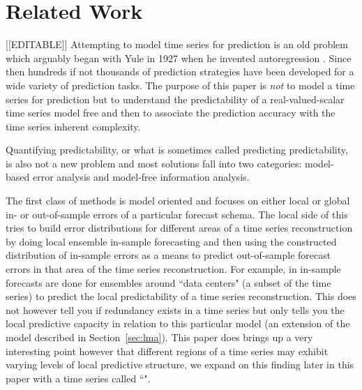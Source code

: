 \section{Related Work }\label{sec:related}
{\color{blue}[[EDITABLE]]}
Attempting to model time series for prediction is an old problem which arguably began with Yule in 1927 when he invented autoregression \cite{Yule27}. Since then hundreds if not thousands of prediction strategies have been developed for a wide variety of prediction tasks. The purpose of this paper is \emph{not} to model a time series for prediction but to understand the predictability of a real-valued-scalar time series model free and then to associate the prediction accuracy with the time series inherent complexity. 

Quantifying predictability, or what is sometimes called predicting predictability, is also not a new problem and most solutions fall into two categories: model-based error analysis and model-free information analysis.





The first class of methods is model oriented and focuses on either local or global in- or out-of-sample errors of a particular forecast schema. The local side of this tries to build error distributions for different areas of a time series reconstruction by doing local ensemble in-sample forecasting and then using the constructed distribution of in-sample errors as a means to predict out-of-sample forecast errors in that area of the time series reconstruction. For example, in \cite{Smith199250} in-sample forecasts are done for ensembles around ``data centers" (a subset of the time series) to predict the local predictability of a time series reconstruction. This does not however tell you if redundancy exists in a time series but only tells you the local predictive capacity in relation to this particular model (an extension of the model described in Section~\ref{sec:lma}). This paper does brings up a very interesting point however that different regions of a time series may exhibit varying levels of local predictive structure, we expand on this finding later in this paper with a time series called ``\svd".


